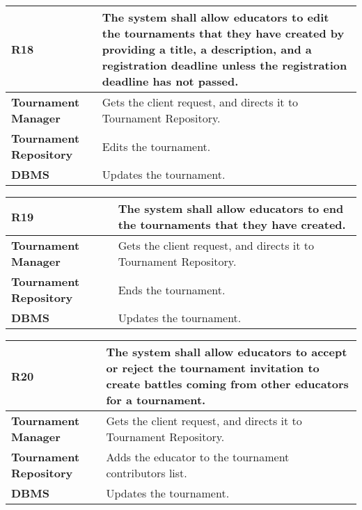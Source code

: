 \begin{table}[h!]
  \centering
  \begin{tabular}{lp{12cm}}
    \hline
    \textbf{R18} & The system shall allow educators to edit the tournaments that they have created by providing a title, a description, and a registration deadline unless the registration deadline has not passed. \\
    \hline
    \hline
    \textbf{Tournament Manager} & Gets the client request, and directs it to Tournament Repository. \\
    \textbf{Tournament Repository} & Edits the tournament.\\
    \textbf{DBMS} & Updates the tournament. \\
    \hline
  \end{tabular}
\end{table}

\begin{table}[h!]
  \centering
  \begin{tabular}{lp{12cm}}
    \hline
    \textbf{R19} & The system shall allow educators to end the tournaments that they have created. \\
    \hline
    \hline
    \textbf{Tournament Manager} & Gets the client request, and directs it to Tournament Repository. \\
    \textbf{Tournament Repository} & Ends the tournament.\\
    \textbf{DBMS} & Updates the tournament. \\
    \hline
  \end{tabular}
\end{table}

\begin{table}[h!]
  \centering
  \begin{tabular}{lp{12cm}}
    \hline
    \textbf{R20} & The system shall allow educators to accept or reject the tournament invitation to create battles coming from other educators for a tournament. \\
    \hline
    \hline
    \textbf{Tournament Manager} & Gets the client request, and directs it to Tournament Repository. \\
    \textbf{Tournament Repository} & Adds the educator to the tournament contributors list.\\
    \textbf{DBMS} & Updates the tournament. \\
    \hline
  \end{tabular}
\end{table}


